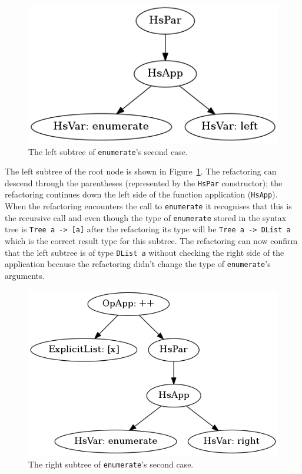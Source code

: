 \begin{figure}[h]
	\begin{center}
		\includegraphics[scale=.5]{graphVis/Chapter3/enumLeft.png}
	\end{center}
	\caption{The left subtree of \texttt{enumerate}'s second case.}
	\label{enumLeft}
\end{figure}

The left subtree of the root node is shown in Figure~\ref{enumLeft}. The refactoring can descend through the parentheses (represented by the \texttt{HsPar} constructor); the refactoring continues down the left side of the function application (\texttt{HsApp}). When the refactoring encounters the call to \texttt{enumerate} it recognises that this is the recursive call and even though the type of \texttt{enumerate} stored in the syntax tree is \texttt{Tree a -> [a]} after the refactoring its type will be \texttt{Tree a -> DList a} which is the correct result type  for this subtree. The refactoring can now confirm that the left subtree is of type \texttt{DList a} without checking the right side of the application because the refactoring didn't change the type of \texttt{enumerate}'s arguments.

\begin{figure}[h]
	\begin{center}
		\includegraphics[scale=.5]{graphVis/Chapter3/enumRight.png}
	\end{center}
	\caption{The right subtree of \texttt{enumerate}'s second case.}
	\label{enumRight}
\end{figure}

